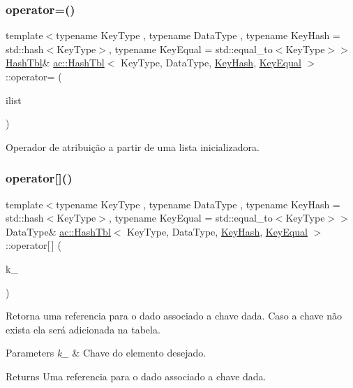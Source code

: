 \subsubsection{\texorpdfstring{operator=()}{operator=()}\hspace{0.1cm}{\footnotesize\ttfamily [2/2]}}
{\footnotesize\ttfamily template$<$typename Key\+Type , typename Data\+Type , typename Key\+Hash  = std\+::hash$<$\+Key\+Type$>$, typename Key\+Equal  = std\+::equal\+\_\+to$<$\+Key\+Type$>$$>$ \\
\hyperlink{classac_1_1_hash_tbl}{Hash\+Tbl}\& \hyperlink{classac_1_1_hash_tbl}{ac\+::\+Hash\+Tbl}$<$ Key\+Type, Data\+Type, \hyperlink{struct_key_hash}{Key\+Hash}, \hyperlink{struct_key_equal}{Key\+Equal} $>$\+::operator= (\begin{DoxyParamCaption}\item[{std\+::initializer\+\_\+list$<$ \hyperlink{classac_1_1_hash_entry}{Entry} $>$}]{ilist }\end{DoxyParamCaption})\hspace{0.3cm}{\ttfamily [inline]}}

Operador de atribuição a partir de uma lista inicializadora. \mbox{\label{classac_1_1_hash_tbl_a2afa09f4f299b65c575675152ba4415b}} 
\subsubsection{\texorpdfstring{operator[]()}{operator[]()}}
{\footnotesize\ttfamily template$<$typename Key\+Type , typename Data\+Type , typename Key\+Hash  = std\+::hash$<$\+Key\+Type$>$, typename Key\+Equal  = std\+::equal\+\_\+to$<$\+Key\+Type$>$$>$ \\
Data\+Type\& \hyperlink{classac_1_1_hash_tbl}{ac\+::\+Hash\+Tbl}$<$ Key\+Type, Data\+Type, \hyperlink{struct_key_hash}{Key\+Hash}, \hyperlink{struct_key_equal}{Key\+Equal} $>$\+::operator\mbox{[}$\,$\mbox{]} (\begin{DoxyParamCaption}\item[{const Key\+Type \&}]{k\+\_\+ }\end{DoxyParamCaption})\hspace{0.3cm}{\ttfamily [inline]}}

Retorna uma referencia para o dado associado a chave dada. Caso a chave não exista ela será adicionada na tabela. 
\begin{DoxyParams}{Parameters}
{\em k\+\_\+} & Chave do elemento desejado. \\
\hline
\end{DoxyParams}
\begin{DoxyReturn}{Returns}
Uma referencia para o dado associado a chave dada. 
\end{DoxyReturn}
\mbox{\label{classac_1_1_hash_tbl_afd9798982409ae5a1955259190fd175e}} 
